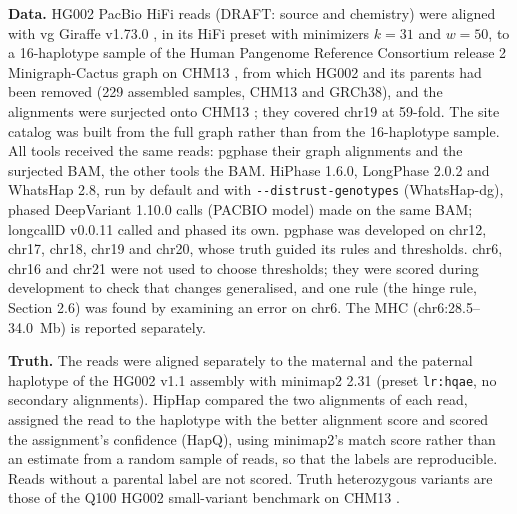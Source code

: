 \textbf{Data.} HG002 \citep{Zook2016} PacBio HiFi reads (DRAFT: source and chemistry) were aligned with vg Giraffe v1.73.0 \citep{Siren2021,Chang2025}, in its HiFi preset with minimizers \(k=31\) and \(w=50\), to a 16-haplotype sample \citep{Siren2024} of the Human Pangenome Reference Consortium release 2 Minigraph-Cactus graph on CHM13 \citep{Liao2023,Hickey2024,HPRC2}, from which HG002 and its parents had been removed (229 assembled samples, CHM13 and GRCh38), and the alignments were surjected onto CHM13 \citep{Nurk2022}; they covered chr19 at 59-fold. The site catalog was built from the full graph rather than from the 16-haplotype sample. All tools received the same reads: pgphase their graph alignments and the surjected BAM, the other tools the BAM. HiPhase 1.6.0, LongPhase 2.0.2 and WhatsHap 2.8, run by default and with \texttt{-{}-distrust-genotypes} (WhatsHap-dg), phased DeepVariant 1.10.0 calls (PACBIO model) made on the same BAM; longcallD v0.0.11 called and phased its own. pgphase was developed on chr12, chr17, chr18, chr19 and chr20, whose truth guided its rules and thresholds. chr6, chr16 and chr21 were not used to choose thresholds; they were scored during development to check that changes generalised, and one rule (the hinge rule, Section 2.6) was found by examining an error on chr6. The MHC (chr6:28.5--34.0~Mb) is reported separately.

\textbf{Truth.} The reads were aligned separately to the maternal and the paternal haplotype of the HG002 v1.1 assembly \citep{Hansen2025} with minimap2 2.31 \citep{Li2018} (preset \texttt{lr:hqae}, no secondary alignments). HipHap \citep{HipHap} compared the two alignments of each read, assigned the read to the haplotype with the better alignment score and scored the assignment's confidence (HapQ), using minimap2's match score rather than an estimate from a random sample of reads, so that the labels are reproducible. Reads without a parental label are not scored. Truth heterozygous variants are those of the Q100 HG002 small-variant benchmark on CHM13 \citep{Hansen2025}.


